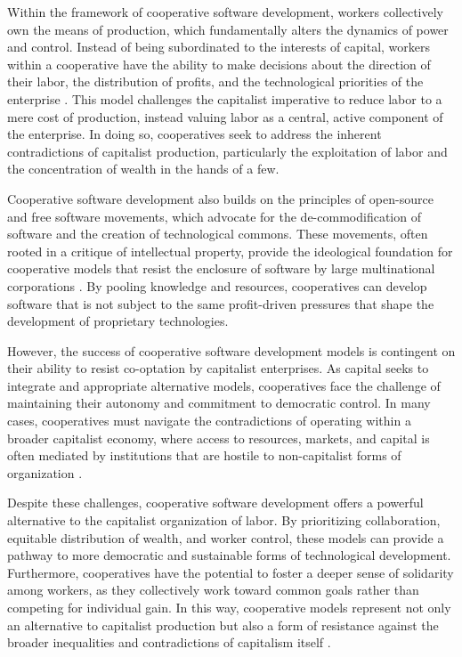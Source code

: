 \begin{refsection}
Within the framework of cooperative software development, workers collectively own the means of production, which fundamentally alters the dynamics of power and control. Instead of being subordinated to the interests of capital, workers within a cooperative have the ability to make decisions about the direction of their labor, the distribution of profits, and the technological priorities of the enterprise \cite[pp.~125-127]{scholz2016}. This model challenges the capitalist imperative to reduce labor to a mere cost of production, instead valuing labor as a central, active component of the enterprise. In doing so, cooperatives seek to address the inherent contradictions of capitalist production, particularly the exploitation of labor and the concentration of wealth in the hands of a few.

Cooperative software development also builds on the principles of open-source and free software movements, which advocate for the de-commodification of software and the creation of technological commons. These movements, often rooted in a critique of intellectual property, provide the ideological foundation for cooperative models that resist the enclosure of software by large multinational corporations \cite[pp.~47-49]{raymond1999}. By pooling knowledge and resources, cooperatives can develop software that is not subject to the same profit-driven pressures that shape the development of proprietary technologies.

However, the success of cooperative software development models is contingent on their ability to resist co-optation by capitalist enterprises. As capital seeks to integrate and appropriate alternative models, cooperatives face the challenge of maintaining their autonomy and commitment to democratic control. In many cases, cooperatives must navigate the contradictions of operating within a broader capitalist economy, where access to resources, markets, and capital is often mediated by institutions that are hostile to non-capitalist forms of organization \cite[pp.~66-68]{schweik2009}.

Despite these challenges, cooperative software development offers a powerful alternative to the capitalist organization of labor. By prioritizing collaboration, equitable distribution of wealth, and worker control, these models can provide a pathway to more democratic and sustainable forms of technological development. Furthermore, cooperatives have the potential to foster a deeper sense of solidarity among workers, as they collectively work toward common goals rather than competing for individual gain. In this way, cooperative models represent not only an alternative to capitalist production but also a form of resistance against the broader inequalities and contradictions of capitalism itself \cite[pp.~91-93]{draper2012}.


\end{refsection}
